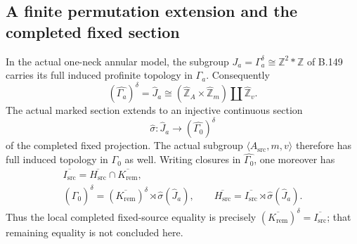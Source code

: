 \subsection*{A finite permutation extension and the completed fixed section}
\label{stmt:B154}
In the actual one-neck annular model, the subgroup
$J_a=\Gamma_a^\delta\cong\mathbb Z^2*\mathbb Z$ of B.149 carries
its full induced profinite topology in $\Gamma_a$. Consequently
\begin{equation}\label{eq:B154-fixed}
 (\widehat{\Gamma_a})^\delta
 =\widehat J_a
 \cong(\widehat{\mathbb Z}_A\times\widehat{\mathbb Z}_m)
       \amalg\widehat{\mathbb Z}_v.
\end{equation}
The actual marked section extends to an injective continuous section
\[
 \widehat\sigma:\widehat J_a\longrightarrow
       (\widehat{\Gamma_0})^\delta
\]
of the completed fixed projection. The actual subgroup
$\langle A_{\mathrm{src}},m,v\rangle$ therefore has full induced topology
in $\Gamma_0$ as well.
Writing closures in $\widehat{\Gamma_0}$, one moreover has
\begin{equation}\label{eq:B154-kernels}
\begin{gathered}
 \overline{I_{\mathrm{src}}}
   =\overline{H_{\mathrm{src}}}\cap\overline{K_{\mathrm{rem}}},\\
 (\widehat{\Gamma_0})^\delta
   =(\overline{K_{\mathrm{rem}}})^\delta
       \rtimes\widehat\sigma(\widehat J_a),\qquad
 \overline{H_{\mathrm{src}}}
   =\overline{I_{\mathrm{src}}}\rtimes\widehat\sigma(\widehat J_a).
\end{gathered}
\end{equation}
Thus the local completed fixed-source equality is precisely
$(\overline{K_{\mathrm{rem}}})^\delta=\overline{I_{\mathrm{src}}}$;
that remaining equality is not concluded here.
